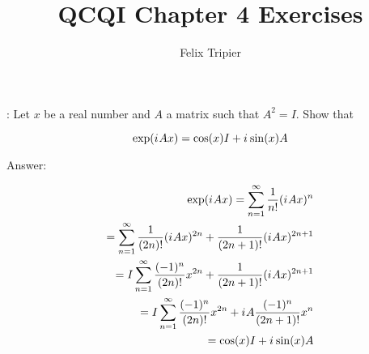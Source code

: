 \documentclass[12pt, letterpaper, twoside]{article}
\title{QCQI Chapter 4 Exercises}
\author{Felix Tripier}
\newcommand{\iu}{{i\mkern1mu}}
\begin{document}
: Let $x$ be a real number and $A$ a matrix such that $A^2 = I$. Show that

$$
	\exp(\iu Ax) = \cos(x)I + \iu \sin(x)A
$$

Answer:

\begin{align}
	\exp(\iu Ax) = \sum_{n=1}^{\infty} \frac{1}{n!} (\iu Ax)^n                                \\
	= \sum_{n=1}^{\infty} \frac{1}{(2n)!} (\iu Ax)^{2n} + \frac{1}{(2n + 1)!} (\iu Ax)^{2n+1} \\
	= I\sum_{n=1}^{\infty} \frac{(-1)^n}{(2n)!} x^{2n} + \frac{1}{(2n + 1)!} (\iu Ax)^{2n+1}  \\
	= I\sum_{n=1}^{\infty} \frac{(-1)^n}{(2n)!} x^{2n} + \iu A\frac{(-1)^n}{(2n + 1)!} x^n    \\
	= \cos(x)I + \iu \sin(x)A
\end{align}
\end{document}
